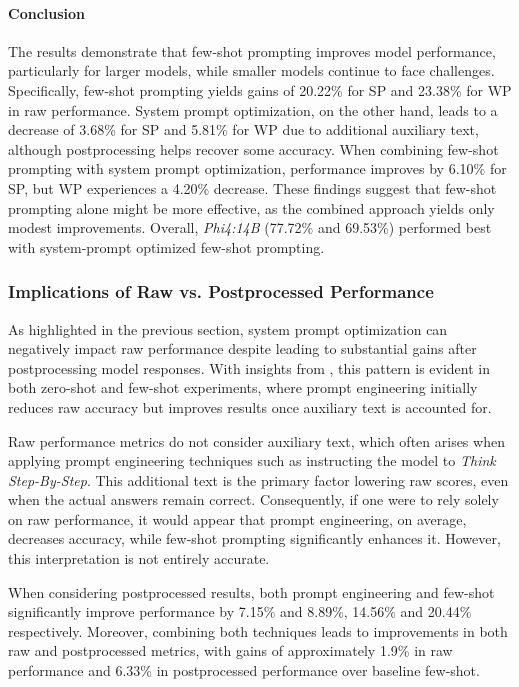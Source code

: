 \paragraph{Conclusion}
The results demonstrate that few-shot prompting improves model performance, particularly for larger models, while smaller models continue to face challenges. Specifically, few-shot prompting yields gains of 20.22\% for \acf{SP} and 23.38\% for \acf{WP} in raw performance. System prompt optimization, on the other hand, leads to a decrease of 3.68\% for \ac{SP} and 5.81\% for \ac{WP} due to additional auxiliary text, although postprocessing helps recover some accuracy. When combining few-shot prompting with system prompt optimization, performance improves by 6.10\% for \ac{SP}, but \ac{WP} experiences a 4.20\% decrease. These findings suggest that few-shot prompting alone might be more effective, as the combined approach yields only modest improvements. Overall, \textit{Phi4:14B} (77.72\% and 69.53\%) performed best with system-prompt optimized few-shot prompting.

\subsubsection{Implications of Raw vs. Postprocessed Performance}
\label{par:raw-vs-post-performance}

As highlighted in the previous section, system prompt optimization can negatively impact raw performance despite leading to substantial gains after postprocessing model responses. With insights from , this pattern is evident in both zero-shot and few-shot experiments, where prompt engineering initially reduces raw accuracy but improves results once auxiliary text is accounted for.

Raw performance metrics do not consider auxiliary text, which often arises when applying prompt engineering techniques such as instructing the model to \textit{Think Step-By-Step}. This additional text is the primary factor lowering raw scores, even when the actual answers remain correct. Consequently, if one were to rely solely on raw performance, it would appear that prompt engineering, on average, decreases accuracy, while few-shot prompting significantly enhances it. However, this interpretation is not entirely accurate.

When considering postprocessed results, both prompt engineering and few-shot significantly improve performance by 7.15\% and 8.89\%, 14.56\% and 20.44\% respectively. Moreover, combining both techniques leads to improvements in both raw and postprocessed metrics, with gains of approximately 1.9\% in raw performance and 6.33\% in postprocessed performance over baseline few-shot.

